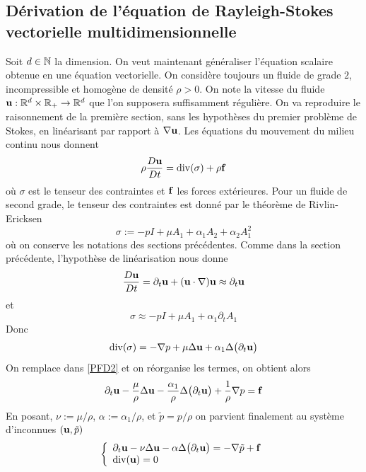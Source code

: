 \subsection{Dérivation de l'équation de Rayleigh-Stokes vectorielle multidimensionnelle}\label{RS_vectorielle}
Soit $d \in \mathbb{N}$ la dimension. On veut maintenant généraliser l'équation scalaire obtenue en une équation vectorielle. On considère toujours un fluide de grade $2$, incompressible et homogène de densité $\rho>0$. On note la vitesse du fluide $\bm{\mathrm{u}}:\mathbb{R}^d \times \mathbb{R}_+ \rightarrow \mathbb{R}^d$ que l'on supposera suffisamment régulière. On va reproduire le raisonnement de la première section, sans les hypothèses du premier problème de Stokes, en linéarisant par rapport à $\nabla \bm{\mathrm{u}}$. Les équations du mouvement du milieu continu nous donnent 
\begin{equation}\label{PFD2}
    \rho \frac{D\bm{\mathrm{u}}}{Dt} = \mathrm{div}(\sigma) + \rho \bm{\mathrm{f}}
\end{equation}
où $\sigma$ est le tenseur des contraintes et $\bm{\mathrm{f}}$ les forces extérieures. Pour un fluide de second grade, le tenseur des contraintes est donné par le théorème de Rivlin-Ericksen
\begin{equation*}
    \sigma := -pI + \mu A_1 + \alpha_1 A_2 + \alpha_2 A_1^2
\end{equation*}
où on conserve les notations des sections précédentes. Comme dans la section précédente, l'hypothèse de linéarisation nous donne 
\begin{equation*}
    \frac{D\bm{\mathrm{u}}}{Dt} = \partial_t\bm{\mathrm{u}} + (\bm{\mathrm{u}} \cdot \nabla)\bm{\mathrm{u}} \approx \partial_t \bm{\mathrm{u}}
\end{equation*}
et 
\begin{equation*}
    \sigma \approx -pI + \mu A_1 + \alpha_1\partial_tA_1
\end{equation*}
Donc 
\begin{equation*}
    \mathrm{div}(\sigma) = -\nabla p +\mu \Delta \bm{\mathrm{u}} + \alpha_1 \Delta\big(\partial_t \bm{\mathrm{u}} \big)
\end{equation*}
On remplace dans \eqref{PFD2} et on réorganise les termes, on obtient alors 
\begin{equation*}
    \partial_t\bm{\mathrm{u}} - \frac{\mu}{\rho}\Delta \bm{\mathrm{u}} - \frac{\alpha_1}{\rho}\Delta \big(\partial_t \bm{\mathrm{u}}\big) +\frac{1}{\rho}\nabla p= \bm{\mathrm{f}} 
\end{equation*}
En posant, $\nu := \mu/\rho$, $\alpha := \alpha_1/\rho$, et $\tilde{p}=p/\rho$ on parvient finalement au système d'inconnues $(\bm{\mathrm{u}}, \tilde{p})$
\begin{equation}\label{eq_RS}
    \left\{\begin{array}{l}
         \partial_t\bm{\mathrm{u}} - \nu\Delta \bm{\mathrm{u}} - \alpha\Delta \big(\partial_t \bm{\mathrm{u}}\big) = -\nabla \tilde{p} + \bm{\mathrm{f}}  \\
         \mathrm{div} (\bm{\mathrm{u}}) = 0
    \end{array}\right.
\end{equation}

\newpage